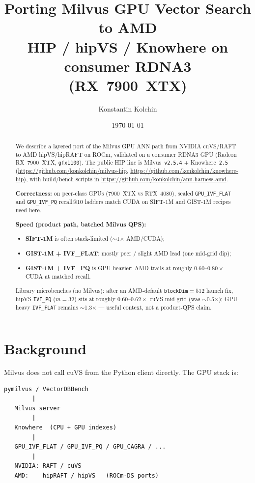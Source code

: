\documentclass[11pt,a4paper]{article}
\title{Porting Milvus GPU Vector Search to AMD\\[0.3em]
\large HIP / hipVS / Knowhere on consumer RDNA3 (RX~7900~XTX)}
\author{Konstantin Kolchin}
\date{\today}
\begin{document}
\maketitle

\begin{abstract}
We describe a layered port of the Milvus GPU ANN path from NVIDIA cuVS/RAFT to
AMD hipVS/hipRAFT on ROCm, validated on a consumer RDNA3 GPU
(Radeon RX~7900~XTX, \texttt{gfx1100}).
The public HIP line is Milvus~\texttt{v2.5.4} + Knowhere~\texttt{2.5}
(\url{https://github.com/konkolchin/milvus-hip},
\url{https://github.com/konkolchin/knowhere-hip}),
with build/bench scripts in
\url{https://github.com/konkolchin/ann-harness-amd}.

\textbf{Correctness:} on peer-class GPUs (7900~XTX vs RTX~4080), sealed
\texttt{GPU\_IVF\_FLAT} and \texttt{GPU\_IVF\_PQ} recall@10 ladders match CUDA
on SIFT-1M and GIST-1M recipes used here.

\textbf{Speed (product path, batched Milvus QPS):}
\begin{itemize}[nosep,leftmargin=*]
  \item \textbf{SIFT-1M} is often stack-limited ($\sim$1$\times$ AMD/CUDA);
  \item \textbf{GIST-1M + IVF\_FLAT}: mostly peer / slight AMD lead
        (one mid-grid dip);
  \item \textbf{GIST-1M + IVF\_PQ} is GPU-heavier: AMD trails at roughly
        $0.60$--$0.80\times$ CUDA at matched recall.
\end{itemize}
Library microbenches (no Milvus): after an AMD-default
\texttt{blockDim}${=}512$ launch fix, hipVS \texttt{IVF\_PQ} ($m{=}32$) sits at
roughly $0.60$--$0.62\times$ cuVS mid-grid (was $\sim$0.5$\times$); GPU-heavy
\texttt{IVF\_FLAT} remains $\sim$1.3$\times$ --- useful context, not a product-QPS claim.
\end{abstract}

\tableofcontents
\clearpage

\section{Background}
\label{sec:background}

Milvus does not call cuVS from the Python client directly. The GPU stack is:

\begin{verbatim}
pymilvus / VectorDBBench
        |
   Milvus server
        |
   Knowhere  (CPU + GPU indexes)
        |
   GPU_IVF_FLAT / GPU_IVF_PQ / GPU_CAGRA / ...
        |
   NVIDIA: RAFT / cuVS
   AMD:    hipRAFT / hipVS   (ROCm-DS ports)
\end{verbatim}
\end{document}
